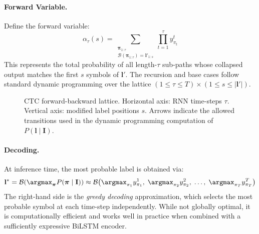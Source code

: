\documentclass[11pt, a4paper]{article}
\begin{document}
\paragraph{Forward Variable.}
Define the forward variable:
\begin{equation}\label{eq:forward_var}
  \alpha_\tau(s) = \sum_{\substack{\boldsymbol{\pi}_{1:\tau} \\ \mathcal{B}(\boldsymbol{\pi}_{1:\tau}) = \mathbf{l}'_{1:s}}} \prod_{t=1}^{\tau} y_{\pi_t}^t
\end{equation}
This represents the total probability of all length-$\tau$ sub-paths whose collapsed output matches the first $s$ symbols of $\mathbf{l}'$. The recursion and base cases follow standard dynamic programming over the lattice $(1 \leq \tau \leq T) \times (1 \leq s \leq |\mathbf{l}'|)$.

\begin{figure}[H]
  \centering
  \caption{CTC forward-backward lattice. Horizontal axis: RNN time-steps $\tau$. Vertical axis: modified label positions $s$. Arrows indicate the allowed transitions used in the dynamic programming computation of $P(\mathbf{l} \mid \mathbf{I})$.}
  \label{fig:ctc_lattice}
\end{figure}


\paragraph{Decoding.}
At inference time, the most probable label is obtained via:
\begin{equation}\label{eq:ctc_decode}
  \mathbf{l}^* = \mathcal{B}\!\left(\argmax_{\boldsymbol{\pi}} P(\boldsymbol{\pi} \mid \mathbf{I})\right) \approx \mathcal{B}\!\left(\argmax_{\pi_1} y_{\pi_1}^1,\; \argmax_{\pi_2} y_{\pi_2}^2,\; \ldots,\; \argmax_{\pi_T} y_{\pi_T}^T\right)
\end{equation}
The right-hand side is the \emph{greedy decoding} approximation, which selects the most probable symbol at each time-step independently. While not globally optimal, it is computationally efficient and works well in practice when combined with a sufficiently expressive BiLSTM encoder.
\end{document}
